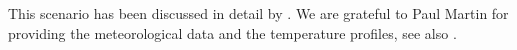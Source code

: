This scenario has been discussed in detail by \cite{Burchardetal99}.
We are grateful to Paul Martin for providing the meteorological data
and the temperature profiles, see also \cite{Martin85}.

%
%
%
%
%
